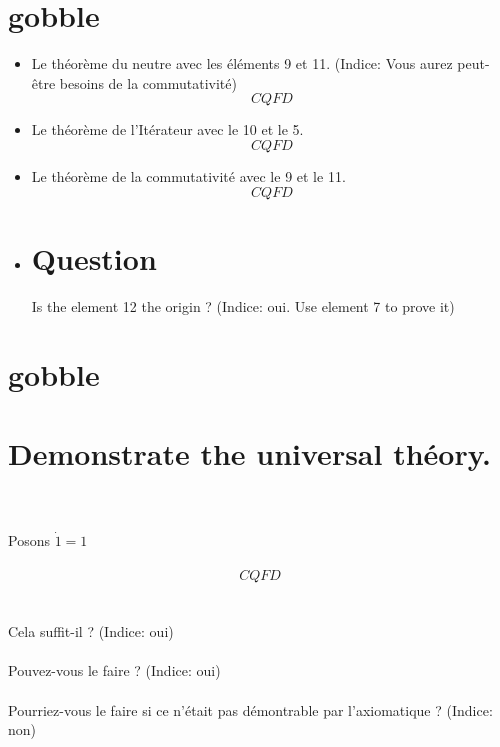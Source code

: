 \documentclass{article}
\begin{document}
  \section{gobble}
    \begin{itemize}
      \item     
	Le théorème du neutre avec les éléments 9 et 11. (Indice: Vous aurez peut-être besoins de la commutativité)
        \begin{equation*}
		CQFD
        \end{equation*}
      \item
        Le théorème de l'Itérateur avec le 10 et le 5.
        \begin{equation*}
		CQFD
        \end{equation*}
      \item
        Le théorème de la commutativité avec le 9 et le 11.
        \begin{equation*}
		CQFD
        \end{equation*}
      \item
        \section{Question}
          Is the element 12 the origin ? (Indice: oui. Use element 7 to prove it)
    \end{itemize}
    \section{gobble}
    \section{Demonstrate the universal théory.}
        ~\\
        ~\\
	Posons $\dot{1} = 1$
        ~\\
        ~\\
        \begin{equation*}
                CQFD
        \end{equation*}
        ~\\
        ~\\
	Cela suffit-il ? (Indice: oui)
        ~\\
        ~\\
	Pouvez-vous le faire ? (Indice: oui)
        ~\\
        ~\\
	Pourriez-vous le faire si ce n'était pas démontrable par l'axiomatique ? (Indice: non)
\end{document}
